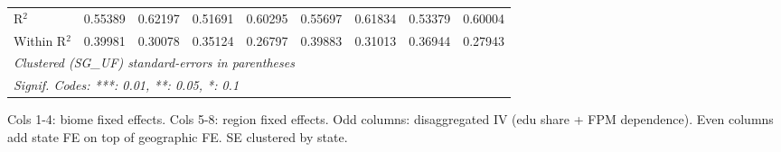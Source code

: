 \begin{tabular}{lcccccccc}
   R$^2$                        & 0.55389         & 0.62197         & 0.51691         & 0.60295         & 0.55697         & 0.61834         & 0.53379         & 0.60004\\  
   Within R$^2$                 & 0.39981         & 0.30078         & 0.35124         & 0.26797         & 0.39883         & 0.31013         & 0.36944         & 0.27943\\  
   \midrule \midrule
   \multicolumn{9}{l}{\emph{Clustered (SG\_UF) standard-errors in parentheses}}\\
   \multicolumn{9}{l}{\emph{Signif. Codes: ***: 0.01, **: 0.05, *: 0.1}}\\
\end{tabular}
 
\par \raggedright 
Cols 1-4: biome fixed effects. Cols 5-8: region fixed effects. Odd columns: disaggregated IV (edu share + FPM dependence). Even columns add state FE on top of geographic FE. SE clustered by state.
\par\endgroup
